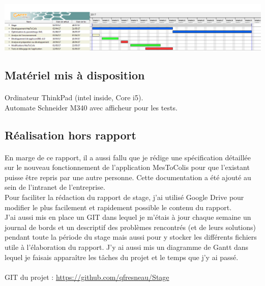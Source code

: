 \documentclass[a4paper,12pt]{extarticle}
\begin{document}
			\centerline{\includegraphics[scale=0.4]{DiagrammeDeGantt}}
	
	\subsection{Matériel mis à disposition}
		\paragraph{}
			
	Ordinateur ThinkPad (intel inside, Core i5).\\
Automate Schneider M340 avec afficheur pour les tests.\\
	
	\subsection{Réalisation hors rapport}
		\paragraph{}
			
	
	En marge de ce rapport, il a aussi fallu que je rédige une spécification détaillée sur le nouveau fonctionnement de l’application MesToColis pour que l'existant puisse être repris par une autre personne. Cette documentation a été ajouté au sein de l’intranet de l’entreprise.\\
Pour faciliter la rédaction du rapport de stage, j’ai utilisé Google Drive pour modifier le plus facilement et rapidement possible le contenu du rapport.\\
J’ai aussi mis en place un GIT dans lequel je m’étais à jour chaque semaine un journal de bords et un descriptif des problèmes rencontrés (et de leurs solutions) pendant toute la période du stage mais aussi pour y stocker les différents fichiers utile à l’élaboration du rapport. J’y ai aussi mis un diagramme de Gantt dans lequel je faisais apparaître les tâches du projet et le temps que j’y ai passé.\\ \\

GIT du projet : \url{https://github.com/qfresneau/Stage}\\
	\clearpage
\end{document}
